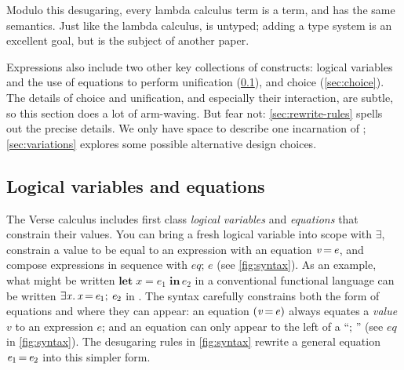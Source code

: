 \documentclass[acmsmall]{acmart}
\newcommand{\Varid}[1]{\mathit{#1}}
\begin{document}
Modulo this desugaring, every lambda calculus term is a \versecalc{} term,
and has the same semantics. Just like the lambda calculus, \versecalc{} is untyped;
adding a type system is an excellent goal, but is the subject of another paper.

Expressions also include two other key collections of constructs:
logical variables and the use of equations to perform unification (\cref{sec:unify}), and choice (\cref{sec:choice}).
The details of choice and unification, and especially their
interaction, are subtle, so this section does a lot of
arm-waving.  But fear not: \cref{sec:rewrite-rules} spells out the precise details.
We only have space to describe one incarnation of \versecalc{}; \cref{sec:variations}
explores some possible alternative design choices.

\subsection{Logical variables and equations} \label{sec:unify}

The Verse calculus includes first class \emph{logical variables} and \emph{equations} that constrain their values.
You can bring a fresh logical variable into scope with \ensuremath{\exists{}}, constrain a value to be equal to
an expression with an equation
\ensuremath{\Varid{v}\hspace{-0.14em}=\hspace{-0.14em}\Varid{e}}, and compose expressions in sequence with \ensuremath{eq;\,\Varid{e}} (see \cref{fig:syntax}).
As an example, what might be written \ensuremath{\textbf{let}\;\Varid{x}=\Varid{e}_{\mathrm{1}}\;\textbf{in}\,\Varid{e}_{\mathrm{2}}} in a conventional functional language can be written
\ensuremath{\exists\Varid{x}.\,\Varid{x}\hspace{-0.14em}=\hspace{-0.14em}\Varid{e}_{\mathrm{1}};\,\Varid{e}_{\mathrm{2}}} in \versecalc{}.  The syntax carefully constrains both the form of
equations and where they can appear: an equation \ensuremath{(\Varid{v}\hspace{-0.14em}=\hspace{-0.14em}\Varid{e})} always equates a \emph{value} $v$ to an expression $e$;
and an equation can only appear to the left of a ``\ensuremath{;\,}'' (see \ensuremath{eq} in \cref{fig:syntax}).
The desugaring rules in \cref{fig:syntax} rewrite a general equation \ensuremath{\Varid{e}_{\mathrm{1}}\hspace{-0.14em}=\hspace{-0.14em}\Varid{e}_{\mathrm{2}}} into this simpler form.
\end{document}
